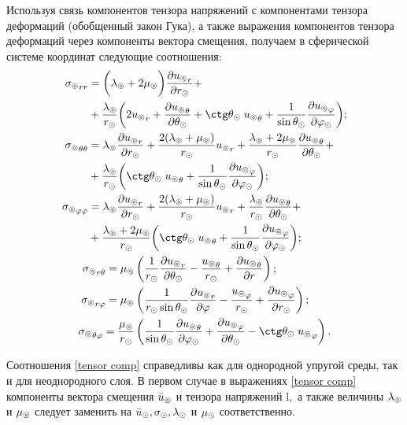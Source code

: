 Используя связь компонентов тензора напряжений с компонентами тензора деформаций (обобщенный закон Гука), а также выражения компонентов тензора деформаций через компоненты вектора смещения, получаем в сферической системе координат следующие соотношения:
\begin{equation}\label{tensor comp}
    \begin{gathered}
    \begin{aligned}
        {\si\l}_{rr} &= \biggl(\la\l+2\mu\l\biggr)\fr{\de {u\l}_r}{\de r\s} +\\
        &+ \fr{\la\l} {r\s} \biggl(2{u\l}_r+\fr{\de {u\l}_\Q}{\de\Q\s}+\ctg\Q\s\;{u\l}_\Q + \fr{1}{\sin\Q\s}\fr{\de {u\l}_\f}{\de\f\s}\biggr);\\        
        {\si\l}_{\Q\Q} &= \la\l\fr{\de {u\l}_r}{\de r\s} + \fr{2(\la\l+\mu\l)}{r\s} {u\l}_r + \fr{\la\l+2\mu\l}{r\s} \fr{\de {u\l}_\Q}{\de\Q\s} +\\
         &+ \fr{\la\l}{r\s} \biggl(\ctg\Q\s \;{u\l}_\Q + \fr{1}{\sin\Q\s}\fr{\de {u\l}_\f}{\de\f\s}\biggr);\\
        {\si\l}_{\f\f} &= \la\l\fr{\de {u\l}_r}{\de r\s} + \fr{2(\la\l+\mu\l)}{r\s} {u\l}_r + \fr{\la\l}{r\s} \fr{\de {u\l}_\Q}{\de\Q\s} +\\
        &+ \fr{\la\l+2\mu\l}{r\s}\biggl(\ctg\Q\s \;{u\l}_\Q + \fr{1}{\sin\Q\s}\fr{\de {u\l}_\f}{\de\f\s}\biggr);\\
    \end{aligned}\\
    \begin{aligned}
        {\si\l}_{r\Q}=\mu\l&\left(\fr1{r\s} \fr{\de {u\l}_r}{\de\Q\s} - \fr{{u\l}_\Q}{r\s} + \fr{\de {u\l}_\Q}{\de r}\right);\\
        {\si\l}_{r\f}=\mu\l&\left(\fr1{r\s\sin\Q\s} \fr{\de {u\l}_r}{\de\f} - \fr{{u\l}_\f}{r\s} + \fr{\de {u\l}_\f}{\de r\s}\right);\\
        {\si\l}_{\Q\f}=\fr{\mu\l} {r\s}&\left(\fr1{\sin\Q\s} \fr{\de {u\l}_\Q}{\de\f\s} + \fr{\de {u\l}_\f}{\de\Q\s} - \ctg\Q\s \;{u\l}_\f \right).\\
    \end{aligned}
    \end{gathered}
\end{equation}

Соотношения \eqref{tensor comp} справедливы как для однородной упругой среды, так и для неоднородного слоя. В первом случае в выражениях \eqref{tensor comp} компоненты вектора смещения $\bar{u}_\circledcirc$ и тензора напряжений $\si\l,$ а также величины $\lambda_\circledcirc$ и $\mu_\circledcirc$ следует заменить на $\bar{u}_\odot, \sigma_\odot, \lambda_\odot$ и $\mu_\odot$ соответственно.

